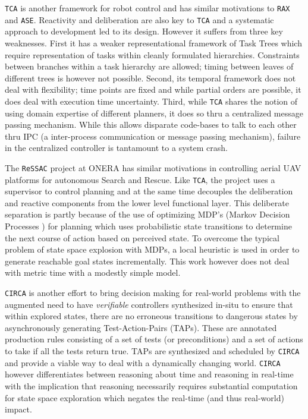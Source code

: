 \texttt{TCA} \cite{simmons94} is another framework for robot control
and has similar motivations to \texttt{RAX} and
\texttt{ASE}. Reactivity and deliberation are also key to \texttt{TCA}
and a systematic approach to development led to its design. However it
suffers from three key weaknesses. First it has a weaker
representational framework of Task Trees which require representation
of tasks within cleanly formulated hierarchies. Constraints between
branches within a task hierarchy are allowed; timing between leaves of
different trees is however not possible. Second, its temporal
framework does not deal with flexibility; time points are fixed and
while partial orders are possible, it does deal with execution time
uncertainty. Third, while \texttt{TCA} shares the notion of using
domain expertise of different planners, it does so thru a centralized
message passing mechanism. While this allows disparate code-bases to
talk to each other thru IPC (a inter-process communication or message
passing mechanism), failure in the centralized controller is
tantamount to a system crash.

The \texttt{ReSSAC} project at ONERA \cite{teichteil07} has similar
motivations in controlling aerial UAV platforms for autonomous Search
and Rescue. Like \texttt{TCA}, the project uses a supervisor to
control planning and at the same time decouples the deliberation and
reactive components from the lower level functional layer. This
deliberate separation is partly because of the use of optimizing MDP’s
(Markov Decision Processes \cite{mdp93}) for planning which uses
probabilistic state transitions to determine the next course of action
based on perceived state. To overcome the typical problem of state
space explosion with MDPs, a local heuristic is used in order to
generate reachable goal states incrementally. This work however does
not deal with metric time with a modestly simple model.

\texttt{CIRCA} \cite{musliner95} is another effort to bring decision
making for real-world problems with the augmented need to have
\emph{verifiable} controllers synthesized in-situ to ensure that
within explored states, there are no erroneous transitions to
dangerous states by asynchronously generating Test-Action-Pairs
(TAPs).  These are annotated production rules consisting of a set of
tests (or preconditions) and a set of actions to take if all the tests
return true. TAPs are synthesized and scheduled by \texttt{CIRCA} and
provide a viable way to deal with a dynamically changing
world. \texttt{CIRCA} however differentiates between reasoning about
time and reasoning in real-time with the implication that reasoning
necessarily requires substantial computation for state space
exploration which negates the real-time (and thus real-world)
impact. 

